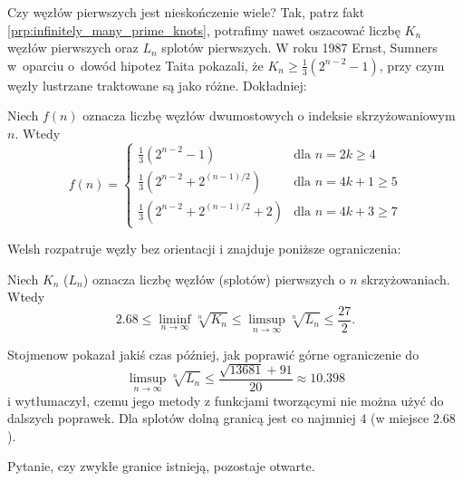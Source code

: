 Czy węzłów pierwszych jest nieskończenie wiele?
Tak, patrz fakt \ref{prp:infinitely_many_prime_knots}, potrafimy nawet oszacować liczbę $K_n$ węzłów pierwszych oraz $L_n$ splotów pierwszych.
W roku 1987 Ernst, Sumners \cite{ernst87} w~oparciu o~dowód hipotez Taita pokazali, że $K_n \ge \frac 1 3 (2^{n- 2} - 1)$, przy czym węzły lustrzane traktowane są jako różne.
%
%
Dokładniej:

\begin{proposition}
%
    Niech $f(n)$ oznacza liczbę węzłów dwumostowych o indeksie skrzyżowaniowym $n$.
    Wtedy
    \begin{equation}
        f(n) = \begin{cases}
        \frac 13 (2^{n-2} - 1) & \text{dla } n = 2k \ge 4 \\
        \frac 13 (2^{n-2} + 2^{(n-1)/2}) & \text{dla } n = 4k + 1 \ge 5 \\
        \frac 13 (2^{n-2} + 2^{(n-1)/2} + 2) & \text{dla } n = 4k + 3 \ge 7
        \end{cases}
    \end{equation}
\end{proposition}

Welsh \cite{welsh92} rozpatruje węzły bez orientacji i znajduje poniższe ograniczenia:
%

\begin{proposition}
    Niech $K_n$ ($L_n$) oznacza liczbę węzłów (splotów) pierwszych o $n$ skrzyżowaniach.
    Wtedy
    \begin{equation}
        2.68 \le \liminf_{n \to \infty} \sqrt[n]{K_n} \le \limsup_{n \to \infty} \sqrt[n]{L_n} \le \frac {27}{2}.
    \end{equation}
\end{proposition}

Stojmenow \cite{stoimenowb04} pokazał jakiś czas później, jak poprawić górne ograniczenie do
\begin{equation}
    \limsup_{n \to \infty} \sqrt[n]{L_n} \le \frac{\sqrt{13681} + 91}{20} \approx 10.398
\end{equation}
i wytłumaczył, czemu jego metody z funkcjami tworzącymi nie można użyć do dalszych poprawek.
%
Dla splotów dolną granicą jest co najmniej $4$ (w miejsce $2.68$).

Pytanie, czy zwykłe granice istnieją, pozostaje otwarte.



